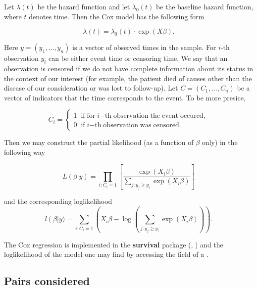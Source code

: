 Let $\lambda(t)$ be the hazard function and let $\lambda_0(t)$ be the baseline hazard function, where $t$ denotes time. Then the Cox model has the following form

$$\lambda(t) = 
\lambda_0(t)\cdot \exp{(X\beta)}.$$

Here $y = (y_1, \ldots, y_n)$ is a vector of observed times in the sample. For $i$-th observation $y_i$ can be either event time or censoring time. We say that an observation is censored if we do not have complete information about its status in the context of our interest (for example, the patient died  of causes other than the disease of our consideration or was lost to follow-up). Let $C = (C_1, \ldots, C_n)$ be a vector of indicators that the time corresponds to the event. To be more presice,

$$C_i = \left\{
                \begin{array}{ll}
                  1 \;\; \mathrm{if \; for} \; i 
                  \mathrm{-th \; 
                  observation \; the \; event \; occured,} \\
                  0 \;\; \mathrm{if} \; i \mathrm{-th \;
                  observation \; was \; censored.}
                \end{array}
              \right.$$

Then we may construct the partial likelihood (as a function of $\beta$ only) in the following way

$$L(\beta|y) = 
	\prod_{i: C_i = 1}
		\left[
			\frac{\exp{\left(X_i\beta\right)}}
					{\sum_{j: y_j \geq y_i} 
					\exp{\left(X_i\beta\right)}}
			\right]$$
			
and the corresponding loglikelihood
$$
l\left(\beta\right|y) = 
	\sum_{i:C_i = 1} 
		\left(
			X_i\beta -
			\log{
				\left(
				\sum_{j:y_j\geq y_i} 
				\exp{\left(X_i\beta\right)}		
				\right)
			}
		\right).
$$


The Cox regression is implemented in the \textbf{survival} package (, \citealp{survival-book})
and the loglikelihood of the model one may find by accessing the field  of a .



\subsection{Pairs considered}


